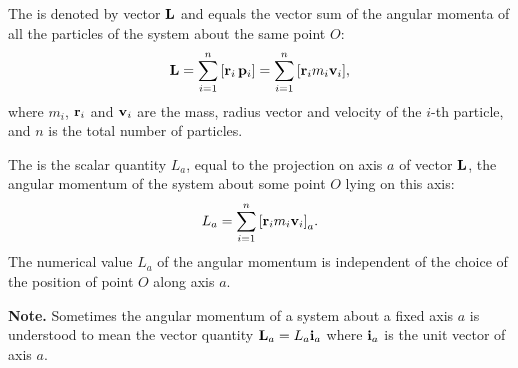 The  is denoted by vector $\vb{L}$ and equals the vector sum of the angular momenta of all the particles of the system about the same point $O$:
\begin{equation*}%
\vb{L} = \sum_{i=1}^{n}\qty[\vb{r}_{i}\,\vb{p}_{i}] = \sum_{i=1}^{n}\qty[\vb{r}_{i}m_{i}\vb{v}_{i}],
\end{equation*}
where $m_{i}$, $\vb{r}_{i}$ and $\vb{v}_{i}$ are the mass, radius vector and velocity of the $i$-th particle, and $n$ is the total number of particles.

The  is the scalar quantity $L_{a}$, equal to the projection on axis $a$ of vector $\vb{L}$, the angular momentum of the system about some point $O$ lying on this axis:
\begin{equation*}%
L_{a} = \sum_{i=1}^{n} \qty[\vb{r}_{i}m_{i}\vb{v}_{i}]_{a}.
\end{equation*}
The numerical value $L_{a}$ of the angular momentum is indepen­dent of the choice of the position of point $O$ along axis $a$.

\textbf{Note.} Sometimes the angular momentum of a system about a fixed axis $a$ is understood to mean the vector quantity $\vb{L}_{a}  = L_{a}\vb{i}_{a}$ where $\vb{i}_{a}$ is the unit vector of axis $a$.

